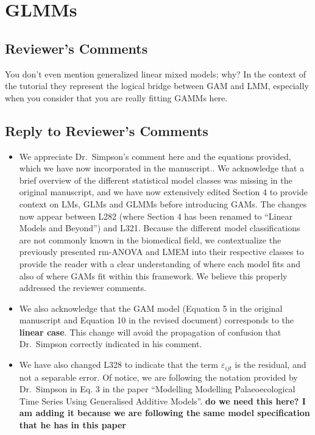 \documentclass[
]{article}
\begin{document}
\hypertarget{glmms}{%
\section{GLMMs}\label{glmms}}

\hypertarget{reviewers-comments-2}{%
\subsection{Reviewer's Comments}\label{reviewers-comments-2}}

You don't even mention generalized linear mixed models; why? In the context of the tutorial they represent the logical bridge between GAM and LMM, especially when you consider that you are really fitting GAMMs here.

\hypertarget{section-3}{%
\subsection{\texorpdfstring{\textcolor{reviewersblue} {Reply to Reviewer's Comments}}{}}\label{section-3}}

\begin{itemize}
\item
  We appreciate Dr.~Simpson's comment here and the equations provided, which we have now incorporated in the manuscript.. We acknowledge that a brief overview of the different statistical model classes was missing in the original manuscript, and we have now extensively edited Section 4 to provide context on LMs, GLMs and GLMMs before introducing GAMs. The changes now appear between L282 (where Section 4 has been renamed to ``Linear Models and Beyond'') and L321. Because the different model classifications are not commonly known in the biomedical field, we contextualize the previously presented rm-ANOVA and LMEM into their respective classes to provide the reader with a clear understanding of where each model fits and also of where GAMs fit within this framework. We believe this properly addressed the reviewer comments.
\item
  We also acknowledge that the GAM model (Equation 5 in the original manuscript and Equation 10 in the revised document) corresponds to the \textbf{linear case}. This change will avoid the propagation of confusion that Dr.~Simpson correctly indicated in his comment.
\item
  We have also changed L328 to indicate that the term \(\varepsilon_{ijt}\) is the residual, and not a separable error. Of notice, we are following the notation provided by Dr.~Simpson in Eq. 3 in the paper ``Modelling Modelling Palaeoecological Time Series Using Generalised Additive Models''. \textbf{do we need this here? I am adding it because we are following the same model specification that he has in this paper}
\end{itemize}
\end{document}
